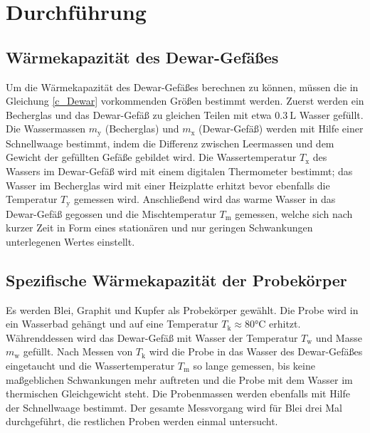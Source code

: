 \section{Durchführung}
\label{sec:Durchfuehrung}
\subsection{Wärmekapazität des Dewar-Gefäßes}
Um die Wärmekapazität des Dewar-Gefäßes berechnen zu können, müssen die in Gleichung \eqref{c_Dewar} vorkommenden Größen bestimmt werden.
Zuerst werden ein Becherglas und das Dewar-Gefäß zu gleichen Teilen mit etwa $\SI{0.3}{\liter}$ Wasser gefüllt. 
Die Wassermassen $m_\mathup{y}$ (Becherglas) und $m_\mathup{x}$ (Dewar-Gefäß) werden mit Hilfe einer Schnellwaage bestimmt, indem die Differenz zwischen Leermassen und dem Gewicht der gefüllten Gefäße gebildet wird.
Die Wassertemperatur $T_\mathup{x}$ des Wassers im Dewar-Gefäß wird mit einem digitalen Thermometer bestimmt; das Wasser im Becherglas wird mit einer Heizplatte erhitzt bevor ebenfalls die Temperatur $T_\mathup{y}$ gemessen wird. 
Anschließend wird das warme Wasser in das Dewar-Gefäß gegossen und die Mischtemperatur $T_\mathup{m}$ gemessen, welche sich nach kurzer Zeit in Form eines stationären und nur geringen Schwankungen unterlegenen Wertes einstellt.

\subsection{Spezifische Wärmekapazität der Probekörper}
Es werden Blei, Graphit und Kupfer als Probekörper gewählt.
Die Probe wird in ein Wasserbad gehängt und auf eine Temperatur $T_\mathup{k}\approx80\si\celsius$ erhitzt. 
Währenddessen wird das Dewar-Gefäß mit Wasser der Temperatur $T_\mathup{w}$ und Masse $m_\mathup{w}$ gefüllt. 
Nach Messen von $T_\mathup{k}$ wird die Probe in das Wasser des Dewar-Gefäßes eingetaucht und die Wassertemperatur $T_\mathup{m}$ so lange gemessen, bis keine maßgeblichen Schwankungen mehr auftreten und die Probe mit dem Wasser im thermischen Gleichgewicht steht.
Die Probenmassen werden ebenfalls mit Hilfe der Schnellwaage bestimmt.
Der gesamte Messvorgang wird für Blei drei Mal durchgeführt, die restlichen Proben werden einmal untersucht.
